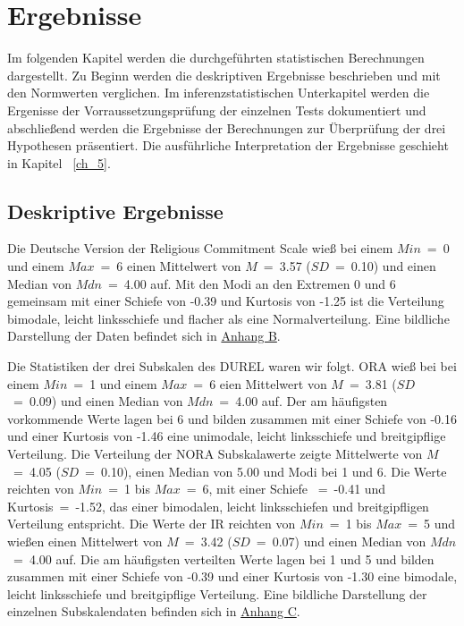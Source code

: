 \chapter{Ergebnisse}   \label{ch_4}
Im folgenden Kapitel werden die durchgeführten statistischen Berechnungen dargestellt. Zu Beginn werden die deskriptiven Ergebnisse beschrieben und mit den Normwerten verglichen. Im inferenzstatistischen Unterkapitel werden die Ergenisse der Vorraussetzungsprüfung der einzelnen Tests dokumentiert und abschließend werden die Ergebnisse der Berechnungen zur Überprüfung der drei Hypothesen präsentiert. Die ausführliche Interpretation der Ergebnisse geschieht in Kapitel ~\ref{ch_5}.

\section{Deskriptive Ergebnisse}    \label{sec_4.1}
Die Deutsche Version der Religious Commitment Scale wieß bei einem $Min$~=~0 und einem $Max$~=~6 einen Mittelwert von $M$~=~3.57 ($SD$~=~0.10) und einen Median von $Mdn$~=~4.00 auf. Mit den Modi an den Extremen 0 und 6 gemeinsam mit einer Schiefe von -0.39 und Kurtosis von -1.25 ist die Verteilung bimodale, leicht linksschiefe und flacher als eine Normalverteilung. 
Eine bildliche Darstellung der Daten befindet sich in \hyperref [Deskriptive_RC]{Anhang B}.

Die Statistiken der drei Subskalen des DUREL waren wir folgt. ORA wieß bei bei einem $Min$~=~1 und einem $Max$~=~6 eien Mittelwert von $M$~=~3.81 ($SD$~=~0.09) und einen Median von $Mdn$~=~4.00 auf. Der am häufigsten vorkommende Werte lagen bei 6 und bilden zusammen mit einer Schiefe von -0.16 und einer Kurtosis von -1.46 eine unimodale, leicht linksschiefe und breitgipflige Verteilung. 
Die Verteilung der NORA Subskalawerte zeigte Mittelwerte von $M$~=~4.05 ($SD$~=~0.10), einen Median von 5.00 und Modi bei 1 und 6. Die Werte reichten von $Min$~=~1 bis $Max$~=~6, mit einer Schiefe ~=~-0.41 und Kurtosis~=~-1.52, das einer bimodalen, leicht linksschiefen und breitgipfligen Verteilung entspricht.
Die Werte der IR reichten von $Min$~=~1 bis $Max$~=~5 und wießen einen Mittelwert von $M$~=~3.42 ($SD$~=~0.07) und einen Median von $Mdn$~=~4.00 auf. Die am häufigsten verteilten Werte lagen bei 1 und 5 und bilden zusammen mit einer Schiefe von -0.39 und einer Kurtosis von -1.30 eine bimodale, leicht linksschiefe und breitgipflige Verteilung.
Eine bildliche Darstellung der einzelnen Subskalendaten befinden sich in \hyperref [Deskriptive_DUREL]{Anhang C}.

